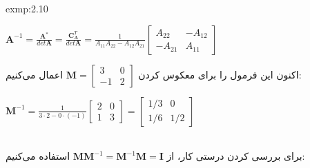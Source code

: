 {\begin{spacing}{1.5}
\begin{exmp}{exmp:2.10}
            \begin{center}
                $\textbf{A}^{-1}=\frac{\displaystyle \textbf{A}^{*}}{\displaystyle det\textbf{A}}=\frac{\displaystyle \textbf{C}^{T}_{\textbf{A}}}{\displaystyle det\textbf{A}}=\frac{\displaystyle 1}{\displaystyle A_{11}A_{22}-A_{12}A_{21}}\begin{bmatrix}
                                                                                                                                                                                                                                                   A_{22}  & -A_{12} \\
                                                                                                                                                                                                                                                   -A_{21} & A_{11}
                \end{bmatrix}$
            \end{center}

            اکنون این فرمول را برای معکوس کردن $\textbf{M}=\begin{bmatrix}
                                                               3  & 0 \\
                                                               -1 & 2
            \end{bmatrix}$ اعمال می‌کنیم:

            \begin{center}
                $\textbf{M}^{-1}=\frac{\displaystyle 1}{\displaystyle 3\cdot 2-0\cdot(-1)}\begin{bmatrix}
                                                                                              2 & 0 \\
                                                                                              1 & 3
                \end{bmatrix}=\begin{bmatrix}
                                  1/3 & 0   \\
                                  1/6 & 1/2
                \end{bmatrix}$
            \end{center}

            \\برای بررسی کردن درستی کار، از $\textbf{M}\textbf{M}^{-1}=\textbf{M}^{-1}\textbf{M}=\textbf{I}$ استفاده می‌کنیم:


\end{exmp}
\end{spacing}}
